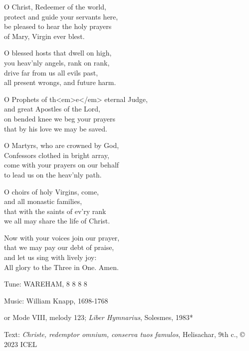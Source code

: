 \hymn

\begin{hymnverse}
O Christ, Redeemer of the world,\\
protect and guide your servants here,\\
be pleased to hear the holy prayers\\
of Mary, Virgin ever blest.

O blessed hosts that dwell on high,\\
you heav’nly angels, rank on rank,\\
drive far from us all evils past,\\
all present wrongs, and future harm.

O Prophets of th<em>e</em> eternal Judge,\\
and great Apostles of the Lord,\\
on bended knee we beg your prayers\\
that by his love we may be saved.

O Martyrs, who are crowned by God,\\
Confessors clothed in bright array,\\
come with your prayers on our behalf\\
to lead us on the heav’nly path.

O choirs of holy Virgins, come,\\
and all monastic families,\\
that with the saints of ev’ry rank\\
we all may share the life of Christ.

Now with your voices join our prayer,\\
that we may pay our debt of praise,\\
and let us sing with lively joy:\\
All glory to the Three in One. Amen.
\end{hymnverse}

\begin{hymnsource}
Tune: WAREHAM, 8 8 8 8

Music: William Knapp, 1698-1768

or Mode VIII, melody 123; \emph{Liber Hymnarius}, Solesmes, 1983*

Text: \emph{Christe, redemptor omnium, conserva tuos famulos}, Helisachar, 9th c., © 2023 ICEL
\end{hymnsource}